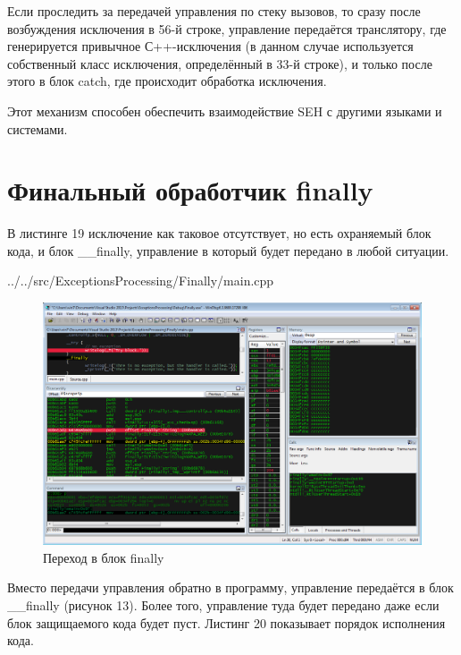 \documentclass[a4paper, 12pt]{report}		%
\begin{document}


Если проследить за передачей управления по стеку вызовов, то сразу после возбуждения исключения в 56-й строке, управление передаётся транслятору, где генерируется привычное С++-исключения (в данном случае используется собственный класс исключения, определённый в 33-й строке), и только после этого в блок catch, где происходит обработка исключения.

Этот механизм способен обеспечить взаимодействие SEH с другими языками и системами.

\chapter*{Финальный обработчик finally}

В листинге 19 исключение как таковое отсутствует, но есть охраняемый блок кода, и блок \_\_finally, управление в который будет передано в любой ситуации.


{../../src/ExceptionsProcessing/Finally/main.cpp}

\begin{figure}[h!]
\centering
\includegraphics[scale=0.50]{res/013}
\caption{Переход в блок finally}
\end{figure}



Вместо передачи управления обратно в программу, управление передаётся в блок \_\_finally (рисунок 13). Более того, управление туда будет передано даже если блок защищаемого кода будет пуст. Листинг 20 показывает порядок исполнения кода.
\end{document}
